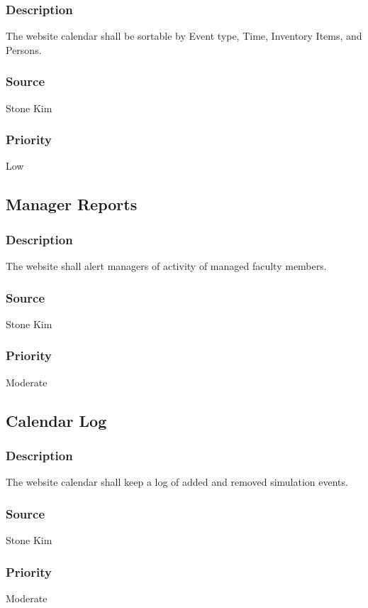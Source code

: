 \subsubsection{Description}
The website calendar shall be sortable by Event type, Time, Inventory Items, and Persons.
\subsubsection{Source}
Stone Kim
\subsubsection{Priority}
Low

\subsection{Manager Reports}
\subsubsection{Description}
The website shall alert managers of activity of managed faculty members.
\subsubsection{Source}
Stone Kim
\subsubsection{Priority}
Moderate

\subsection{Calendar Log}
\subsubsection{Description}
The website calendar shall keep a log of added and removed simulation events.
\subsubsection{Source}
Stone Kim
\subsubsection{Priority}
Moderate